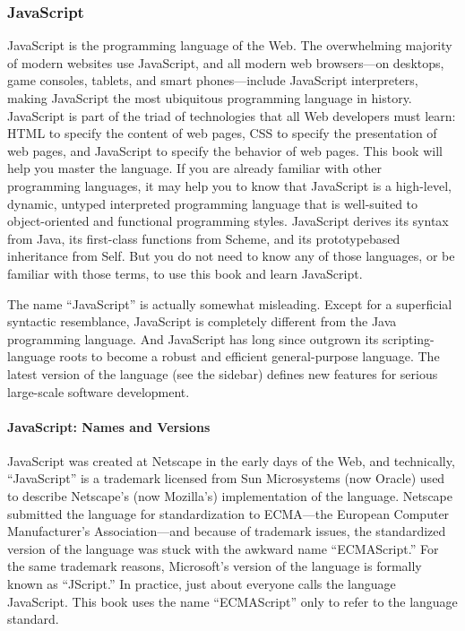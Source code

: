 \subsubsection{JavaScript}
JavaScript is the programming language of the Web. The overwhelming majority of
modern websites use JavaScript, and all modern web browsers—on desktops, game
consoles, tablets, and smart phones—include JavaScript interpreters, making JavaScript
the most ubiquitous programming language in history. JavaScript is part of the
triad of technologies that all Web developers must learn: HTML to specify the content
of web pages, CSS to specify the presentation of web pages, and JavaScript to specify
the behavior of web pages. This book will help you master the language.
If you are already familiar with other programming languages, it may help you to know
that JavaScript is a high-level, dynamic, untyped interpreted programming language
that is well-suited to object-oriented and functional programming styles. JavaScript
derives its syntax from Java, its first-class functions from Scheme, and its prototypebased
inheritance from Self. But you do not need to know any of those languages, or
be familiar with those terms, to use this book and learn JavaScript.

The name “JavaScript” is actually somewhat misleading. Except for a superficial syntactic
resemblance, JavaScript is completely different from the Java programming language.
And JavaScript has long since outgrown its scripting-language roots to become
a robust and efficient general-purpose language. The latest version of the language (see
the sidebar) defines new features for serious large-scale software development.

\paragraph*{JavaScript: Names and Versions}
\hfill \break
JavaScript was created at Netscape in the early days of the Web, and technically, “JavaScript”
is a trademark licensed from Sun Microsystems (now Oracle) used to describe
Netscape’s (now Mozilla’s) implementation of the language. Netscape submitted the
language for standardization to ECMA—the European Computer Manufacturer’s Association—and
because of trademark issues, the standardized version of the language
was stuck with the awkward name “ECMAScript.” For the same trademark reasons,
Microsoft’s version of the language is formally known as “JScript.” In practice, just
about everyone calls the language JavaScript. This book uses the name “ECMAScript”
only to refer to the language standard.


